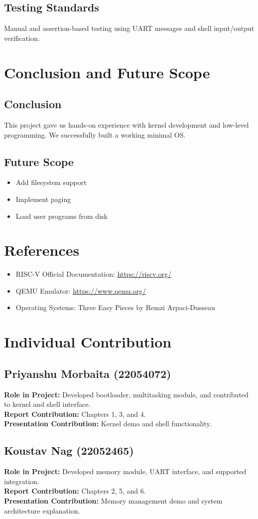 \documentclass[a4paper,12pt]{report}
\begin{document}
\section{Testing Standards}
Manual and assertion-based testing using UART messages and shell input/output verification.

\chapter{Conclusion and Future Scope}
\section{Conclusion}
This project gave us hands-on experience with kernel development and low-level programming. We successfully built a working minimal OS.

\section{Future Scope}
\begin{itemize}
    \item Add filesystem support
    \item Implement paging
    \item Load user programs from disk
\end{itemize}

\chapter*{References}
\begin{itemize}
    \item RISC-V Official Documentation: \url{https://riscv.org/}
    \item QEMU Emulator: \url{https://www.qemu.org/}
    \item Operating Systems: Three Easy Pieces by Remzi Arpaci-Dusseau
\end{itemize}

\chapter*{Individual Contribution}
\section*{Priyanshu Morbaita (22054072)}
\textbf{Role in Project:} Developed bootloader, multitasking module, and contributed to kernel and shell interface. \\ 
\textbf{Report Contribution:} Chapters 1, 3, and 4. \\ 
\textbf{Presentation Contribution:} Kernel demo and shell functionality.

\section*{Koustav Nag (22052465)}
\textbf{Role in Project:} Developed memory module, UART interface, and supported integration. \\ 
\textbf{Report Contribution:} Chapters 2, 5, and 6. \\ 
\textbf{Presentation Contribution:} Memory management demo and system architecture explanation.
\end{document}
